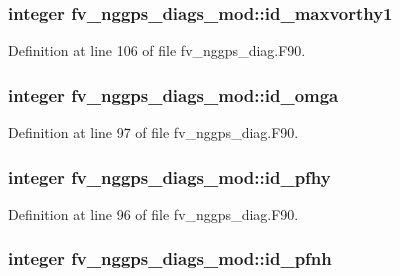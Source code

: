 \subsubsection[{id\-\_\-maxvorthy1}]{\setlength{\rightskip}{0pt plus 5cm}integer fv\-\_\-nggps\-\_\-diags\-\_\-mod\-::id\-\_\-maxvorthy1\hspace{0.3cm}{\ttfamily [private]}}\label{classfv__nggps__diags__mod_a7d134cd1a19c9f09f5b09c792998661c}


Definition at line 106 of file fv\-\_\-nggps\-\_\-diag.\-F90.

\subsubsection[{id\-\_\-omga}]{\setlength{\rightskip}{0pt plus 5cm}integer fv\-\_\-nggps\-\_\-diags\-\_\-mod\-::id\-\_\-omga\hspace{0.3cm}{\ttfamily [private]}}\label{classfv__nggps__diags__mod_ad19e4b6ed51fbcee19a31b34687c712b}


Definition at line 97 of file fv\-\_\-nggps\-\_\-diag.\-F90.

\subsubsection[{id\-\_\-pfhy}]{\setlength{\rightskip}{0pt plus 5cm}integer fv\-\_\-nggps\-\_\-diags\-\_\-mod\-::id\-\_\-pfhy\hspace{0.3cm}{\ttfamily [private]}}\label{classfv__nggps__diags__mod_a714a8b91e9583fc54a76401abf6c942f}


Definition at line 96 of file fv\-\_\-nggps\-\_\-diag.\-F90.

\subsubsection[{id\-\_\-pfnh}]{\setlength{\rightskip}{0pt plus 5cm}integer fv\-\_\-nggps\-\_\-diags\-\_\-mod\-::id\-\_\-pfnh\hspace{0.3cm}{\ttfamily [private]}}\label{classfv__nggps__diags__mod_a807900a4b82994c01e0a4da6bea37cac}


